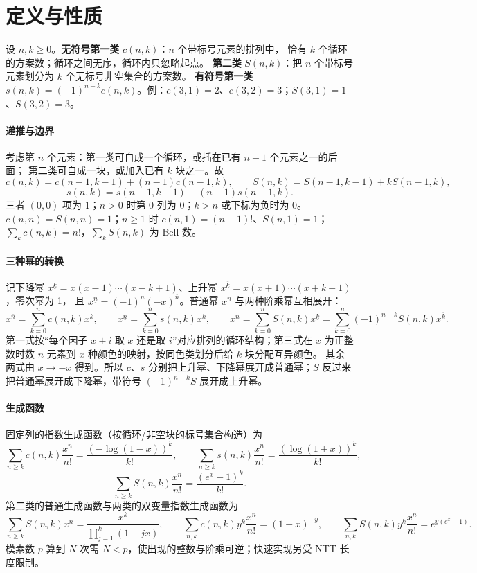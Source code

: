 \section{定义与性质}\label{knowledge-stirling-definitions}
设 $n,k\ge0$。\textbf{无符号第一类} $c(n,k)$：$n$ 个带标号元素的排列中，
恰有 $k$ 个循环的方案数；循环之间无序，循环内只忽略起点。
\textbf{第二类} $S(n,k)$：把 $n$ 个带标号元素划分为 $k$ 个无标号非空集合的方案数。
\textbf{有符号第一类} $s(n,k)=(-1)^{n-k}c(n,k)$。例：$c(3,1)=2$、$c(3,2)=3$；$S(3,1)=1$、$S(3,2)=3$。

\paragraph{递推与边界} 考虑第 $n$ 个元素：第一类可自成一个循环，或插在已有 $n-1$ 个元素之一的后面；
第二类可自成一块，或加入已有 $k$ 块之一。故
\[
 c(n,k)=c(n-1,k-1)+(n-1)c(n-1,k),\qquad
 S(n,k)=S(n-1,k-1)+kS(n-1,k),
\]
\[
 s(n,k)=s(n-1,k-1)-(n-1)s(n-1,k).
\]
三者 $(0,0)$ 项为 1；$n>0$ 时第 0 列为 0；$k>n$ 或下标为负时为 0。
$c(n,n)=S(n,n)=1$；$n\ge1$ 时 $c(n,1)=(n-1)!$、$S(n,1)=1$；$\sum_k c(n,k)=n!$，$\sum_k S(n,k)$ 为 Bell 数。

\paragraph{三种幂的转换} 记下降幂 $x^{\underline{k}}=x(x-1)\cdots(x-k+1)$、上升幂 $x^{\overline{k}}=x(x+1)\cdots(x+k-1)$，零次幂为 1，
且 $x^{\underline n}=(-1)^n(-x)^{\overline n}$。普通幂 $x^n$ 与两种阶乘幂互相展开：
\[
 x^{\overline n}=\sum_{k=0}^n c(n,k)x^k,\qquad
 x^{\underline n}=\sum_{k=0}^n s(n,k)x^k,\qquad
 x^n=\sum_{k=0}^n S(n,k)x^{\underline k}
     =\sum_{k=0}^n(-1)^{n-k}S(n,k)x^{\overline k}.
\]
第一式按“每个因子 $x+i$ 取 $x$ 还是取 $i$”对应排列的循环结构；第三式在 $x$ 为正整数时数 $n$ 元素到 $x$ 种颜色的映射，按同色类划分后给 $k$ 块分配互异颜色。
其余两式由 $x\to-x$ 得到。所以 $c$、$s$ 分别把上升幂、下降幂展开成普通幂；$S$ 反过来把普通幂展开成下降幂，带符号 $(-1)^{n-k}S$ 展开成上升幂。

\paragraph{生成函数} 固定列的指数生成函数（按循环/非空块的标号集合构造）为
\[
 \sum_{n\ge k}c(n,k)\frac{x^n}{n!}=\frac{(-\log(1-x))^k}{k!},\qquad
 \sum_{n\ge k}s(n,k)\frac{x^n}{n!}=\frac{(\log(1+x))^k}{k!},
\]
\[
 \sum_{n\ge k}S(n,k)\frac{x^n}{n!}=\frac{(e^x-1)^k}{k!}.
\]
第二类的普通生成函数与两类的双变量指数生成函数为
\[
 \sum_{n\ge k}S(n,k)x^n=\frac{x^k}{\prod_{j=1}^k(1-jx)},\qquad
 \sum_{n,k}c(n,k)y^k\frac{x^n}{n!}=(1-x)^{-y},\qquad
 \sum_{n,k}S(n,k)y^k\frac{x^n}{n!}=e^{y(e^x-1)}.
\]
模素数 $p$ 算到 $N$ 次需 $N<p$，使出现的整数与阶乘可逆；快速实现另受 NTT 长度限制。

